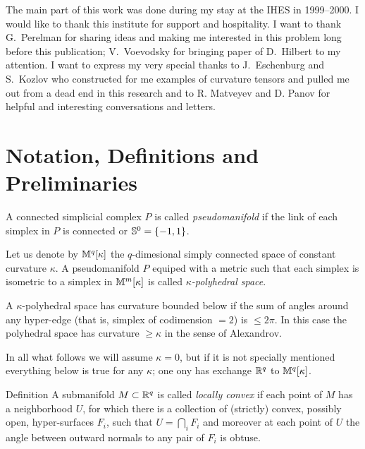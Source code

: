 \documentclass{article}
\begin{document}
\medskip

The main part of this work was done during my stay at the IHES in 1999--2000. I would like to thank this institute for support and hospitality.
I want to thank 
G.~Perelman for sharing ideas and making me interested in this problem long before this publication; 
V.~Voevodsky for bringing paper
of D.~Hilbert to my attention. 
I want to express my very special thanks to J.~Eschenburg and S.~Kozlov who constructed for me
examples of curvature tensors and pulled me out from a
dead end in this research and to R. Matveyev and D. Panov for helpful and interesting conversations and letters.


\section{Notation, Definitions and Preliminaries}





A connected simplicial complex $P$ is called \emph{pseudomanifold}
if the link of each simplex in $P$ is connected or $\mathbb{S}^0=\{-1,1\}$.

Let us denote by $\mathbb{M}^q[\kappa]$ the $q$-dimesional simply connected space of constant curvature $\kappa$.
A pseudomanifold $P$ equiped with a metric 
such that each
simplex is isometric
to a simplex in $\mathbb{M}^m[\kappa]$
is called
\emph{$\kappa$-polyhedral space}. 

A $\kappa$-polyhedral space has curvature bounded below  if  the sum of angles
around any hyper-edge (that is, simplex of codimension $=2$) is $\le 2\pi$.
In this case the polyhedral space has curvature  $\ge \kappa$ in the sense of Alexandrov.

In all what follows we will assume $\kappa=0$,
but if it is not specially
mentioned everything below is true for any $\kappa$;
one ony has exchange $\mathbb{R}^q$ to $\mathbb{M}^q[\kappa]$.





\begin{thm}{Definition}
 A submanifold $M \subset \mathbb{R}^q$ is called
\emph{locally convex} if each point of $M$ has a neighborhood $U$, for which
there is a collection of
 (strictly) convex, possibly open, hyper-surfaces $F_i$,
such that $U=\bigcap_i F_i$ and moreover at each point of $U$ the angle between
outward normals to any pair of $F_i$ is obtuse.
\end{thm}
\end{document}
